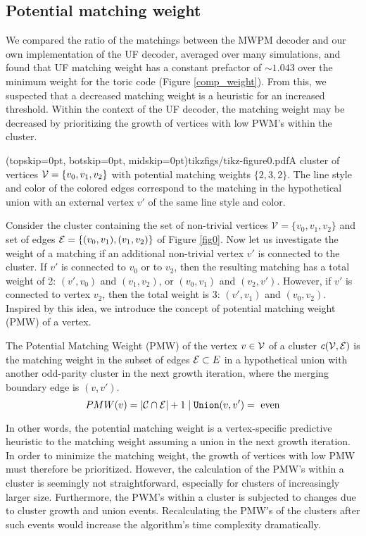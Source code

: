\subsection{Potential matching weight}\label{sec:matchingweight}
We compared the ratio of the matchings between the MWPM decoder and our own implementation of the UF decoder, averaged over many simulations, and found that UF matching weight has a constant prefactor of $\sim 1.043$ over the minimum weight for the toric code (Figure \ref{comp_weight}). From this, we suspected that a decreased matching weight is a heuristic for an increased threshold. Within the context of the UF decoder, the matching weight may be decreased by prioritizing the growth of vertices with low PWM's within the cluster. 

\Figure[htb](topskip=0pt, botskip=0pt, midskip=0pt){tikzfigs/tikz-figure0.pdf}{A cluster of vertices $\mathcal{V}=\{v_0, v_1, v_2\}$ with potential matching weights $\{2, 3, 2\}$. The line style and color of the colored edges correspond to the matching in the hypothetical union with an external vertex $v'$ of the same line style and color.\label{fig0}}

Consider the cluster containing the set of non-trivial vertices $\mathcal{V}=\{v_0,v_1,v_2\}$ and set of edges $\mathcal{E}=\{(v_0,v_1), (v_1, v_2)\}$ of Figure \ref{fig0}. Now let us investigate the weight of a matching if an additional non-trivial vertex $v'$ is connected to the cluster. If $v'$ is connected to $v_0$ or to $v_2$, then the resulting matching has a total weight of 2: $(v',v_0)$ and $(v_1,v_2)$, or $(v_0,v_1)$ and $(v_2,v')$. However, if $v'$ is connected to vertex $v_2$, then the total weight is 3: $(v', v_1)$ and $(v_0, v_2)$. Inspired by this idea, we introduce the concept of potential matching weight (PMW) of a vertex. 

\begin{definition}\label{def:pmw}
    The Potential Matching Weight (PMW) of the vertex $v\in \mathcal{V}$ of a cluster $c(\mathcal{V},\mathcal{E})$ is the matching weight in the subset of edges $\mathcal{E} \subset E$ in a hypothetical union with another odd-parity cluster in the next growth iteration, where the merging boundary edge is $(v,v')$. 
    \begin{equation}
      PMW(v) = \lvert\mathcal{C} \cap \mathcal{E}\rvert + 1 \mid \texttt{Union}(v, v') = \text{ even}
    \end{equation}
\end{definition}
In other words, the potential matching weight is a vertex-specific predictive heuristic to the matching weight assuming a union in the next growth iteration. In order to minimize the matching weight, the growth of vertices with low PMW must therefore be prioritized. However, the calculation of the PMW's within a cluster is seemingly not straightforward, especially for clusters of increasingly larger size. Furthermore, the PWM's within a cluster is subjected to changes due to cluster growth and union events. Recalculating the PMW's of the clusters after such events would increase the algorithm's time complexity dramatically. 
